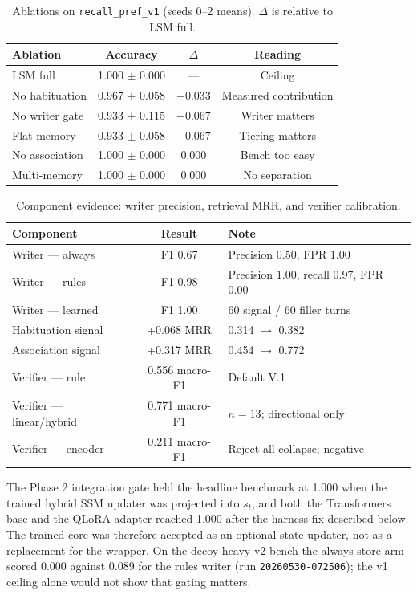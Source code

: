 \documentclass[11pt]{article}
\begin{document}
\begin{table}[t]
\centering
\small
\caption{Ablations on \texttt{recall\_pref\_v1} (seeds 0--2 means). $\Delta$ is relative to LSM full.}
\label{tab:ablations}
\begin{tabular}{lccc}
\toprule
Ablation & Accuracy & $\Delta$ & Reading \\
\midrule
LSM full & 1.000 $\pm$ 0.000 & --- & Ceiling \\
No habituation & 0.967 $\pm$ 0.058 & $-$0.033 & Measured contribution \\
No writer gate & 0.933 $\pm$ 0.115 & $-$0.067 & Writer matters \\
Flat memory & 0.933 $\pm$ 0.058 & $-$0.067 & Tiering matters \\
No association & 1.000 $\pm$ 0.000 & 0.000 & Bench too easy \\
Multi-memory & 1.000 $\pm$ 0.000 & 0.000 & No separation \\
\bottomrule
\end{tabular}
\end{table}

\begin{table}[t]
\centering
\small
\caption{Component evidence: writer precision, retrieval MRR, and verifier calibration.}
\label{tab:components}
\begin{tabular}{lcl}
\toprule
Component & Result & Note \\
\midrule
Writer --- always & F1 0.67 & Precision 0.50, FPR 1.00 \\
Writer --- rules & F1 0.98 & Precision 1.00, recall 0.97, FPR 0.00 \\
Writer --- learned & F1 1.00 & 60 signal / 60 filler turns \\
Habituation signal & +0.068 MRR & 0.314 $\rightarrow$ 0.382 \\
Association signal & +0.317 MRR & 0.454 $\rightarrow$ 0.772 \\
Verifier --- rule & 0.556 macro-F1 & Default V.1 \\
Verifier --- linear/hybrid & 0.771 macro-F1 & $n=13$; directional only \\
Verifier --- encoder & 0.211 macro-F1 & Reject-all collapse; negative \\
\bottomrule
\end{tabular}
\end{table}

The Phase 2 integration gate held the headline benchmark at 1.000 when the trained hybrid SSM updater was projected into $s_t$, and both the Transformers base and the QLoRA adapter reached 1.000 after the harness fix described below. The trained core was therefore accepted as an optional state updater, not as a replacement for the wrapper. On the decoy-heavy v2 bench the always-store arm scored 0.000 against 0.089 for the rules writer (run \texttt{20260530-072506}); the v1 ceiling alone would not show that gating matters.
\end{document}
